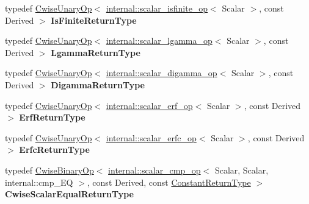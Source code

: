 \begin{DoxyCompactItemize}
\item 
\mbox{\label{class_eigen_1_1_array_base_a63442e29ad518e3ee2ef71427c25c4aa}} 
typedef \mbox{\hyperlink{class_eigen_1_1_cwise_unary_op}{Cwise\+Unary\+Op}}$<$ \mbox{\hyperlink{struct_eigen_1_1internal_1_1scalar__isfinite__op}{internal\+::scalar\+\_\+isfinite\+\_\+op}}$<$ Scalar $>$, const Derived $>$ {\bfseries Is\+Finite\+Return\+Type}
\item 
\mbox{\label{class_eigen_1_1_array_base_ab8ea7724bde1f0e7086dded843c7d5ea}} 
typedef \mbox{\hyperlink{class_eigen_1_1_cwise_unary_op}{Cwise\+Unary\+Op}}$<$ \mbox{\hyperlink{struct_eigen_1_1internal_1_1scalar__lgamma__op}{internal\+::scalar\+\_\+lgamma\+\_\+op}}$<$ Scalar $>$, const Derived $>$ {\bfseries Lgamma\+Return\+Type}
\item 
\mbox{\label{class_eigen_1_1_array_base_a40088160b866924a33c5aaf8eeea009b}} 
typedef \mbox{\hyperlink{class_eigen_1_1_cwise_unary_op}{Cwise\+Unary\+Op}}$<$ \mbox{\hyperlink{struct_eigen_1_1internal_1_1scalar__digamma__op}{internal\+::scalar\+\_\+digamma\+\_\+op}}$<$ Scalar $>$, const Derived $>$ {\bfseries Digamma\+Return\+Type}
\item 
\mbox{\label{class_eigen_1_1_array_base_a1fb4f462a0d6b2a2e3b95de08e6ce112}} 
typedef \mbox{\hyperlink{class_eigen_1_1_cwise_unary_op}{Cwise\+Unary\+Op}}$<$ \mbox{\hyperlink{struct_eigen_1_1internal_1_1scalar__erf__op}{internal\+::scalar\+\_\+erf\+\_\+op}}$<$ Scalar $>$, const Derived $>$ {\bfseries Erf\+Return\+Type}
\item 
\mbox{\label{class_eigen_1_1_array_base_ab1f9c5a7195988d28d223720d5155e76}} 
typedef \mbox{\hyperlink{class_eigen_1_1_cwise_unary_op}{Cwise\+Unary\+Op}}$<$ \mbox{\hyperlink{struct_eigen_1_1internal_1_1scalar__erfc__op}{internal\+::scalar\+\_\+erfc\+\_\+op}}$<$ Scalar $>$, const Derived $>$ {\bfseries Erfc\+Return\+Type}
\item 
\mbox{\label{class_eigen_1_1_array_base_a15d2ab8980d1e624cb985b5f05ef6bd0}} 
typedef \mbox{\hyperlink{class_eigen_1_1_cwise_binary_op}{Cwise\+Binary\+Op}}$<$ \mbox{\hyperlink{struct_eigen_1_1internal_1_1scalar__cmp__op}{internal\+::scalar\+\_\+cmp\+\_\+op}}$<$ Scalar, Scalar, internal\+::cmp\+\_\+\+EQ $>$, const Derived, const \mbox{\hyperlink{class_eigen_1_1_cwise_nullary_op}{Constant\+Return\+Type}} $>$ {\bfseries Cwise\+Scalar\+Equal\+Return\+Type}
\end{DoxyCompactItemize}
